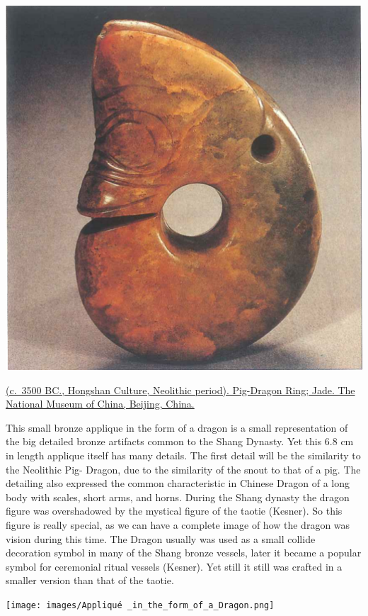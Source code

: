 \documentclass[
]{book}
\begin{document}
\includegraphics[width=1\textwidth,height=\textheight]{images/Jade_Pig_Dragon.png}

\href{}{(c.~3500 BC., Hongshan Culture, Neolithic period). Pig-Dragon Ring; Jade. The National Museum of China, Beijing, China.}

This small bronze applique in the form of a dragon is a small representation of the big detailed bronze artifacts common to the Shang Dynasty. Yet this 6.8 cm in length applique itself has many details. The first detail will be the similarity to the Neolithic Pig- Dragon, due to the similarity of the snout to that of a pig. The detailing also expressed the common characteristic in Chinese Dragon of a long body with scales, short arms, and horns. During the Shang dynasty the dragon figure was overshadowed by the mystical figure of the taotie (Kesner). So this figure is really special, as we can have a complete image of how the dragon was vision during this time. The Dragon usually was used as a small collide decoration symbol in many of the Shang bronze vessels, later it became a popular symbol for ceremonial ritual vessels (Kesner). Yet still it still was crafted in a smaller version than that of the taotie.

\texttt{[image: images/Appliqué \_in\_the\_form\_of\_a\_Dragon.png]}
\end{document}
